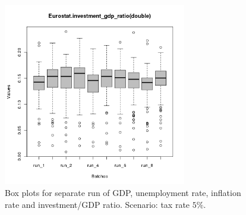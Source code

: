 \begin{figure}[ht!]
\begin{minipage}{17cm}
\includegraphics[width=8cm]{./batch/tax_0.05/Eurostat-investment_gdp_ratio-runbatch.png}
\end{minipage}
\caption{Box plots for separate run of GDP, unemployment rate, inflation rate and investment/GDP ratio. Scenario: tax rate $5\%$.}
\label{Figure: run batch}
\end{figure}
